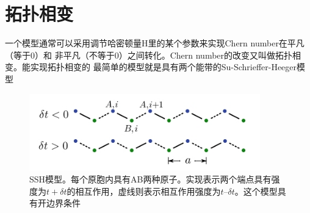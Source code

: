 \section{拓扑相变}
一个模型通常可以采用调节哈密顿量H里的某个参数来实现Chern number在平凡（等于$0$）和
非平凡（不等于$0$）之间转化。Chern number的改变又叫做拓扑相变。能实现拓扑相变的
最简单的模型就是具有两个能带的Su-Schrieffer-Heeger模型
 \begin {figure}[tbp]
\centering 
\includegraphics[width=10cm]{./images/sshmodel.jpg} 
\caption{SSH模型。每个原胞内具有AB两种原子。实现表示两个端点具有强度为$t+\delta t$的相互作用，虚线则表示相互作用强度为$t – \delta t$。这个模型具有开边界条件\cite{topoText}}
\label{sshmodel}
\end {figure} 

